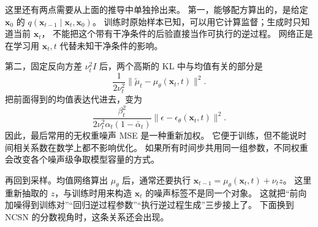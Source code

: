 这里还有两点需要从上面的推导中单独拎出来。
第一，能够配方算出的，是给定 $\mathbf x_0$ 的
$q(\mathbf x_{t-1}\mid\mathbf x_t,\mathbf x_0)$。
训练时原始样本已知，可以用它计算监督；生成时只知道当前 $\mathbf x_t$，
不能把这个带有干净条件的后验直接当作可执行的逆过程。
网络正是在学习用 $\mathbf x_t,t$ 代替未知干净条件的影响。

第二，固定反向方差 $\nu_t^2I$ 后，两个高斯的 KL 中与均值有关的部分是
\[
\frac1{2\nu_t^2}\|\tilde\mu_t-\mu_\theta(\mathbf x_t,t)\|^2.
\]
把前面得到的均值表达代进去，变为
\[
\frac{\beta_t^2}{2\nu_t^2\alpha_t(1-\bar\alpha_t)}
\|\epsilon-\epsilon_\theta(\mathbf x_t,t)\|^2.
\]
因此，最后常用的无权重噪声 MSE 是一种重新加权。
它便于训练，但不能说时间相关系数在数学上都不影响优化。
如果所有时间步共用同一组参数，不同权重会改变各个噪声级争取模型容量的方式。

再回到采样。均值网络算出 $\mu_\theta$ 后，通常还要执行
$\mathbf x_{t-1}=\mu_\theta(\mathbf x_t,t)+\nu_t z$。
这里重新抽取的 $z$，与训练时用来构造 $\mathbf x_t$ 的噪声标签不是同一个对象。
这就把“前向加噪得到训练对”“回归逆过程参数”“执行逆过程生成”三步接上了。
下面换到 NCSN 的分数视角时，这条关系还会出现。\cite{ddpm,theorybook}
